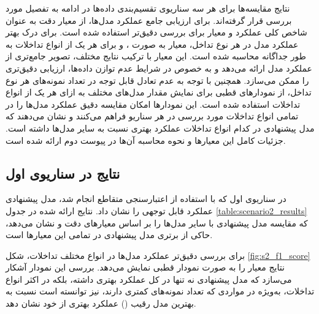 نتایج مقایسه‌ها برای هر سه سناریوی تقسیم‌بندی داده‌ها در ادامه به تفصیل مورد بررسی قرار گرفته‌اند. برای ارزیابی جامع عملکرد مدل‌ها، از معیار دقت به عنوان شاخص کلی عملکرد و معیار  برای بررسی دقیق‌تر استفاده شده است. برای درک بهتر عملکرد مدل در هر نوع تداخل، معیار  به صورت ،  و  برای هر یک از انواع تداخلات به طور جداگانه محاسبه شده است. این معیار با ترکیب نتایج مختلف، تصویر جامع‌تری از عملکرد مدل ارائه می‌دهد و به خصوص در شرایط عدم توازن داده‌ها، ارزیابی دقیق‌تری را ممکن می‌سازد. همچنین با توجه به عدم تعادل قابل توجه در تعداد نمونه‌های هر نوع تداخل، از نمودارهای قطبی برای نمایش مقدار  مدل‌های مختلف به ازای هر یک از انواع تداخلات استفاده شده است. این نمودارها امکان مقایسه دقیق عملکرد مدل‌ها را در تمامی انواع تداخلات مورد بررسی در هر سناریو فراهم می‌کنند و نشان می‌دهند که مدل پیشنهادی در کدام انواع تداخلات عملکرد بهتری نسبت به سایر مدل‌ها داشته است. جزئیات کامل این معیارها و نحوه محاسبه آن‌ها در پیوست دوم ارائه شده است.

\subsection{نتایج در سناریوی اول}

در سناریوی اول که با استفاده از اعتبارسنجی متقاطع  انجام شد، مدل پیشنهادی عملکرد قابل توجهی را نشان داد. نتایج ارائه شده در جدول \ref{table:scenario2_results} که مقایسه مدل پیشنهادی با سایر مدل‌ها را بر اساس معیارهای دقت و  نشان می‌دهد، حاکی از برتری مدل پیشنهادی در تمامی این معیارها است.

برای بررسی دقیق‌تر عملکرد مدل‌ها در انواع مختلف تداخلات، شکل \ref{fig:s2_f1_score} نتایج معیار  را به صورت نمودار قطبی نمایش می‌دهد. بررسی این نمودار آشکار می‌سازد که مدل پیشنهادی نه تنها در کل عملکرد بهتری داشته، بلکه در اکثر انواع تداخلات، به‌ویژه در مواردی که تعداد نمونه‌های کمتری دارند، نیز توانسته است نسبت به بهترین مدل رقیب () عملکرد بهتری از خود نشان دهد.

